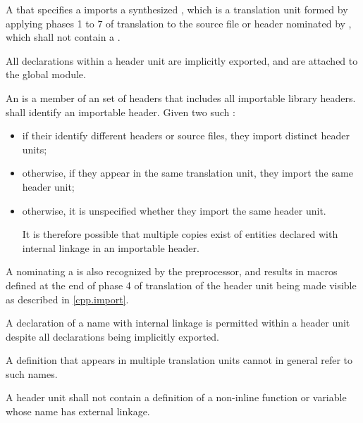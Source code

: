 \pnum
A  that specifies
a   imports
a synthesized ,
which is a translation unit formed by applying
phases 1 to 7 of translation
to the source file or header nominated by ,
which shall not contain a .
\begin{note}
All declarations within a header unit are implicitly
exported,
and are attached to the global module.
\end{note}
An  is a member of an
set of headers that
includes all importable \Cpp{} library headers.
 shall identify an importable header.
Given two such :
\begin{itemize}
\item
if their  identify
different headers or source files,
they import distinct header units;
\item
otherwise, if they appear in the same translation unit,
they import the same header unit;
\item
otherwise, it is unspecified whether they import the same header unit.
\begin{note}
It is therefore possible that multiple copies exist of entities
declared with internal linkage in an importable header.
\end{note}
\end{itemize}
\begin{note}
A  nominating
a  is also recognized by the
preprocessor, and results in macros defined at the
end of phase 4 of translation of the header unit
being made visible as described in \ref{cpp.import}.
\end{note}

\pnum
A declaration of a name with internal linkage is
permitted within a header unit despite all
declarations being implicitly exported.
\begin{note}
A definition that appears in multiple translation units
cannot in general refer to such names.
\end{note}
A header unit shall not contain
a definition of a non-inline function or variable
whose name has external linkage.

